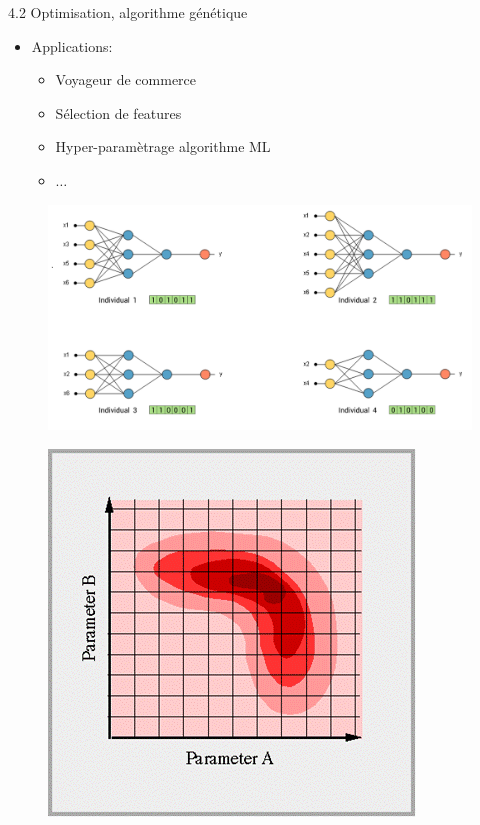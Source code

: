 \begin{frame}{4.2 Optimisation, algorithme génétique}
  \begin{itemize}
  \item Applications:
    \begin{itemize}
      \normalsize
    \item Voyageur de commerce
    \item Sélection de features
    \item Hyper-paramètrage algorithme ML
    \item $\dots$
    \end{itemize}
  \end{itemize}
  \vfill
  \begin{minipage}{0.35\textwidth}
    \vspace{0.5cm}
  \end{minipage}
  \begin{minipage}{0.41\textwidth}
    \vspace{0.5cm}
    \begin{figure}
      \includegraphics[height=0.38\textheight]{figs/individuals_network.png}
    \end{figure}
  \end{minipage}
  \begin{minipage}{0.22\textwidth}
    \vspace{0.5cm}
    \begin{figure}
      \includegraphics[height=0.38\textheight]{figs/gridsearch.png}

\end{figure}
\end{minipage}
\end{frame}
